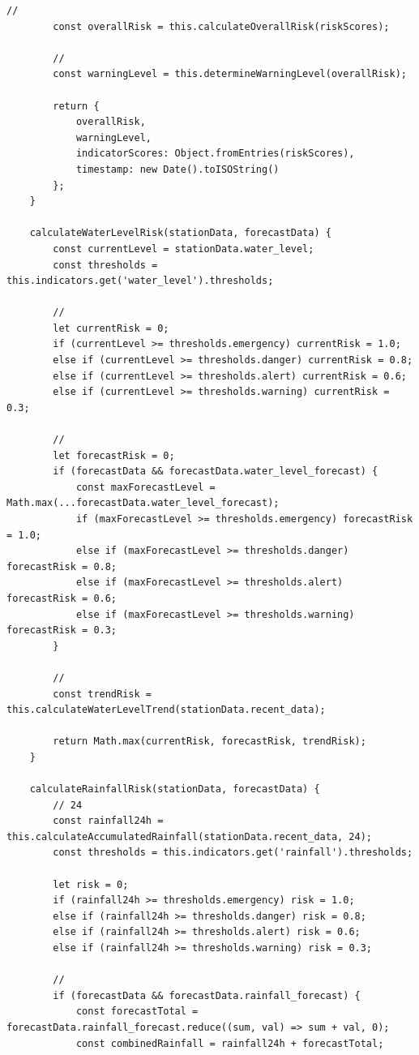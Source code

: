\begin{lstlisting}[style=javascript]
        // 
        const overallRisk = this.calculateOverallRisk(riskScores);
        
        // 
        const warningLevel = this.determineWarningLevel(overallRisk);
        
        return {
            overallRisk,
            warningLevel,
            indicatorScores: Object.fromEntries(riskScores),
            timestamp: new Date().toISOString()
        };
    }
    
    calculateWaterLevelRisk(stationData, forecastData) {
        const currentLevel = stationData.water_level;
        const thresholds = this.indicators.get('water_level').thresholds;
        
        // 
        let currentRisk = 0;
        if (currentLevel >= thresholds.emergency) currentRisk = 1.0;
        else if (currentLevel >= thresholds.danger) currentRisk = 0.8;
        else if (currentLevel >= thresholds.alert) currentRisk = 0.6;
        else if (currentLevel >= thresholds.warning) currentRisk = 0.3;
        
        // 
        let forecastRisk = 0;
        if (forecastData && forecastData.water_level_forecast) {
            const maxForecastLevel = Math.max(...forecastData.water_level_forecast);
            if (maxForecastLevel >= thresholds.emergency) forecastRisk = 1.0;
            else if (maxForecastLevel >= thresholds.danger) forecastRisk = 0.8;
            else if (maxForecastLevel >= thresholds.alert) forecastRisk = 0.6;
            else if (maxForecastLevel >= thresholds.warning) forecastRisk = 0.3;
        }
        
        // 
        const trendRisk = this.calculateWaterLevelTrend(stationData.recent_data);
        
        return Math.max(currentRisk, forecastRisk, trendRisk);
    }
    
    calculateRainfallRisk(stationData, forecastData) {
        // 24
        const rainfall24h = this.calculateAccumulatedRainfall(stationData.recent_data, 24);
        const thresholds = this.indicators.get('rainfall').thresholds;
        
        let risk = 0;
        if (rainfall24h >= thresholds.emergency) risk = 1.0;
        else if (rainfall24h >= thresholds.danger) risk = 0.8;
        else if (rainfall24h >= thresholds.alert) risk = 0.6;
        else if (rainfall24h >= thresholds.warning) risk = 0.3;
        
        // 
        if (forecastData && forecastData.rainfall_forecast) {
            const forecastTotal = forecastData.rainfall_forecast.reduce((sum, val) => sum + val, 0);
            const combinedRainfall = rainfall24h + forecastTotal;
            

\end{lstlisting}
